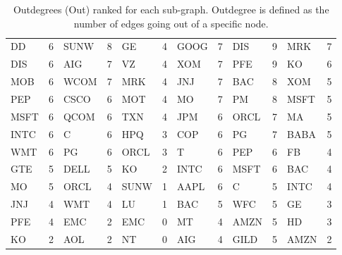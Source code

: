 \begin{table}[]
{\begin{tabular}{|ll|ll|ll|ll|ll|ll|}
DD   & 6  & SUNW & 8  & GE   & 4  & GOOG & 7  & DIS   & 9  & MRK   & 7  \\
DIS  & 6  & AIG  & 7  & VZ   & 4  & XOM  & 7  & PFE   & 9  & KO    & 6  \\
MOB  & 6  & WCOM & 7  & MRK  & 4  & JNJ  & 7  & BAC   & 8  & XOM   & 5  \\
PEP  & 6  & CSCO & 6  & MOT  & 4  & MO   & 7  & PM    & 8  & MSFT  & 5  \\
MSFT & 6  & QCOM & 6  & TXN  & 4  & JPM  & 6  & ORCL  & 7  & MA    & 5  \\
INTC & 6  & C    & 6  & HPQ  & 3  & COP  & 6  & PG    & 7  & BABA  & 5  \\
WMT  & 6  & PG   & 6  & ORCL & 3  & T    & 6  & PEP   & 6  & FB    & 4  \\
GTE  & 5  & DELL & 5  & KO   & 2  & INTC & 6  & MSFT  & 6  & BAC   & 4  \\
MO   & 5  & ORCL & 4  & SUNW & 1  & AAPL & 6  & C     & 5  & INTC  & 4  \\
JNJ  & 4  & WMT  & 4  & LU   & 1  & BAC  & 5  & WFC   & 5  & GE    & 3  \\
PFE  & 4  & EMC  & 2  & EMC  & 0  & MT   & 4  & AMZN  & 5  & HD    & 3  \\
KO   & 2  & AOL  & 2  & NT   & 0  & AIG  & 4  & GILD  & 5  & AMZN  & 2  \\ \hline
\end{tabular}}
\caption{Outdegrees (Out) ranked for each sub-graph. Outdegree is defined as the number of edges going out of a specific node.}
\label{outdegree}
\end{table}




